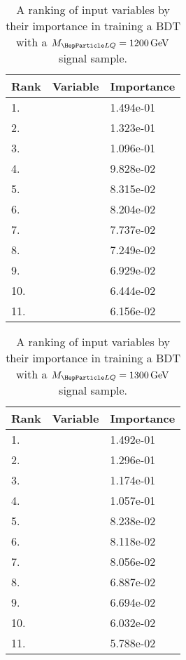 \begin{table}[H]
	\caption{A ranking of input variables by their importance in training a BDT with a $\MLQ = \SI{1200}{GeV}$ signal sample.}
	\begin{center}
		\begin{tabular}{lll} \hline \hline
			Rank & Variable & Importance  \\ \hline
			1. & \MujTwo & 1.494e-01 \\
			2. & \ST & 1.323e-01 \\
			3. & \MujOne & 1.096e-01 \\
			4. & \Muujj & 9.828e-02 \\
			5. & \ptof{\PmuOne} & 8.315e-02 \\
			6. & \ptof{\PmuTwo} & 8.204e-02 \\
			7. & \MET & 7.737e-02 \\
			8. & \ptof{\PjTwo} & 7.249e-02 \\
			9. & \ptof{\PjOne} & 6.929e-02 \\
			10. & \Muu & 6.444e-02 \\
			11. & \DRof{\PmuOne+\PmuTwo}{\PjOne} & 6.156e-02 \\ \hline \hline
		\end{tabular}
		\label{tab:bdtRank1200}
	\end{center}
\end{table}

\begin{table}[H]
	\caption{A ranking of input variables by their importance in training a BDT with a $\MLQ = \SI{1300}{GeV}$ signal sample.}
	\begin{center}
		\begin{tabular}{lll} \hline \hline
			Rank & Variable & Importance  \\ \hline
			1. & \MujTwo & 1.492e-01 \\
			2. & \ST & 1.296e-01 \\
			3. & \MujOne & 1.174e-01 \\
			4. & \Muujj & 1.057e-01 \\
			5. & \ptof{\PjTwo} & 8.238e-02 \\
			6. & \ptof{\PmuOne} & 8.118e-02 \\
			7. & \ptof{\PmuTwo} & 8.056e-02 \\
			8. & \ptof{\PjOne} & 6.887e-02 \\
			9. & \Muu & 6.694e-02 \\
			10. & \MET & 6.032e-02 \\
			11. & \DRof{\PmuOne+\PmuTwo}{\PjOne} & 5.788e-02 \\ \hline \hline
		\end{tabular}
		\label{tab:bdtRank1300}
	\end{center}
\end{table}

